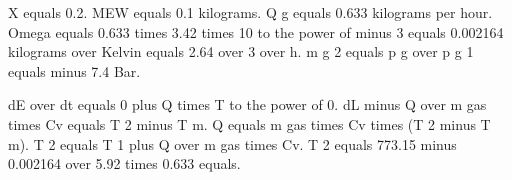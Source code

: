 X equals 0.2.  
MEW equals 0.1 kilograms.  
Q g equals 0.633 kilograms per hour.  
Omega equals 0.633 times 3.42 times 10 to the power of minus 3 equals 0.002164 kilograms over Kelvin equals 2.64 over 3 over h.  
m g 2 equals p g over p g 1 equals minus 7.4 Bar.  

dE over dt equals 0 plus Q times T to the power of 0.  
dL minus Q over m gas times Cv equals T 2 minus T m.  
Q equals m gas times Cv times (T 2 minus T m).  
T 2 equals T 1 plus Q over m gas times Cv.  
T 2 equals 773.15 minus 0.002164 over 5.92 times 0.633 equals.